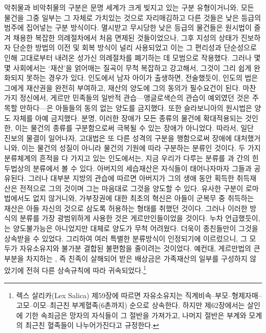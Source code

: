 악취물과 비악취물의 구분은 문명 세계가 크게 빚지고 있는 구분 유형이거니와,
모든 물건을 그중 일부는 그 자체로 가치있는 것으로 자리매김하고
다른 것들은 낮은 등급의 범주에 집어넣는 구분 방식이다.
멸시받고 무시당한
낮은 등급의 물건들은
원시법이 즐겨 채용한 복잡한 의례절차에서 처음 면제된 것들이었으나,
그후 지성의 상태가 진보하자
단순한 방법의 이전 및 회복 방식이 널리 사용되었고 이는
그 편리성과 단순성으로 인해
고대로부터 내려온 성가신 의례절차를 폐기하는 데 모범으로 작용했다.
그러나 몇몇 사회에서는
`재산'을 얽어매는 질곡이 무척 복잡하고 강고해서,
그것이 그리 쉽게 완화되지 못하는 경우가 있다.
인도에서 남자 아이가 출생하면,
전술했듯이,
인도의 법은 그에게 재산권을 완전히 부여하고,
재산의 양도에 그의 동의가 필수요건이 된다.
마찬가지 정신에서,
게르만 민족들의 일반적 관습---앵글로색슨의 관습이 예외였던 것은
주목할 만하다---은
아들들의 동의 없는 양도를 금지했다.
또한 슬라보니아의 원시법은 양도 자체를 아예 금지했다.
분명, 이러한 장애가
모든 종류의 물건에 확대적용되는 것인 한, 이는
물건의 종류를 구분함으로써 극복될 수 있는 장애가 아니었다.
따라서, 일단 진보의 물결이 일어나자,
고대법은 또 다른 성격의 구분을 행함으로써 장애에 대처했거니와,
이는 물건의 성질이 아니라 물건의 기원에 따라 구분하는 분류인 것이다.
두 가지 분류체계의 흔적을 다 가지고 있는
인도에서는, 지금 우리가 다루는 분류를
과
 간의 힌두법상의 분류에서 볼 수 있다.
아버지의 세습재산은 자식들이 태어나자마자 그들과 공유된다.
그러나 대부분 지방의 관습에 따르면
아버지가 그의 생애 동안 획득한 취득재산은 전적으로 그의 것이며
그는 마음대로 그것을 양도할 수 있다.
유사한 구분이 로마법에서도 없지 않거니와,
가부장권에 대한 최초의 혁신은
아들이 군복무 중 취득하는 재산은 아들 자신의 것으로 삼도록
허용하는 형태를 취했던 것이다.
그러나 이러한 방식의 분류를 가장 광범위하게 사용한 것은
게르만인들이었을 것이다.
누차 언급했듯이,
는 양도불가능은 아니었지만
대체로 양도가 무척 어려웠다.
더욱이 종친들만이 그것을 상속받을 수 있었다.
그리하여 여러 특별한 분류방식이 인정되기에 이르렀으니,
그 모두가 자유소유지와 불가분 결합된 불편함을 줄이려는 것이었다.
예컨대,
게르만법의 큰 부분을 차지하는
, 즉
친족이 살해되어 받은 배상금은
가족재산의 일부를 구성하지 않았기에
전혀 다른 상속규칙에 따라 귀속되었다.\footnote{%
  렉스 살리카(Lex Salica) 제59장에 따르면 자유소유지는
  직계비속--부모--형제자매--고모--이모--최근친 부계혈족(6촌까지) 순으로 상속한다.
  하지만 제62장에서는
  살인에 기한 속죄금은 망자의 자식들이 그 절반을 가져가고,
  나머지 절반은 부계와 모계의 최근친 혈족들이 나누어가진다고 규정한다. }
